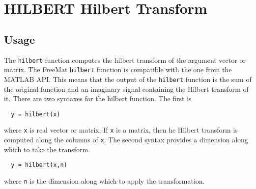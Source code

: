 \section{HILBERT Hilbert Transform}

\subsection{Usage}

The \verb|hilbert| function computes the hilbert transform of the argument
vector or matrix.  The FreeMat \verb|hilbert| function is compatible with
the one from the MATLAB API.  This means that the output of the
\verb|hilbert| function is the sum of the original function and an
imaginary signal containing the Hilbert transform of it.  There are
two syntaxes for the hilbert function.  The first is
\begin{verbatim}
  y = hilbert(x)
\end{verbatim}
where \verb|x| is real vector or matrix.  If \verb|x| is a matrix, then he
Hilbert transform is computed along the columns of \verb|x|.  The
second syntax provides a dimension along which to take the
transform.
\begin{verbatim}
  y = hilbert(x,n)
\end{verbatim}
where \verb|n| is the dimension along which to apply the transformation.
